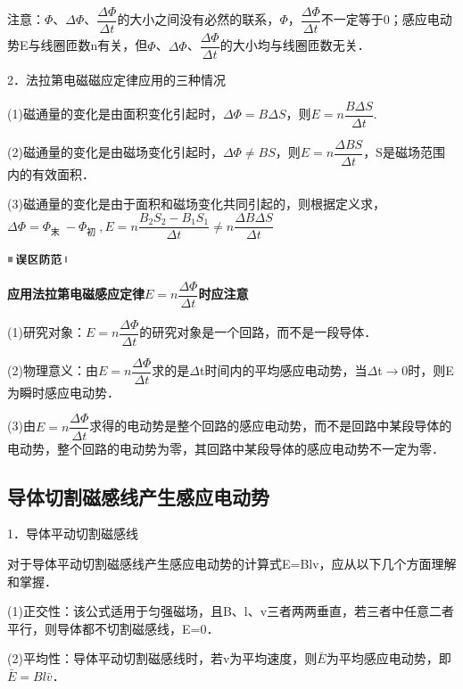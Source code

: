 注意：$\Phi$、$\Delta \Phi$、$\dfrac{\Delta\Phi}{\Delta t}$的大小之间没有必然的联系，$\Phi$，$\dfrac{\Delta\Phi}{\Delta t}$不一定等于0；感应电动势E与线圈匝数n有关，但$\Phi$、$\Delta \Phi$、$\dfrac{\Delta\Phi}{\Delta t}$的大小均与线圈匝数无关．

2．法拉第电磁磁应定律应用的三种情况

(1)磁通量的变化是由面积变化引起时，$\Delta \Phi=B\Delta S$，则$E=n \dfrac{B \Delta S}{\Delta t}$.　

(2)磁通量的变化是由磁场变化引起时，$\Delta \Phi \neq BS$，则$E=n \dfrac{ \Delta BS}{\Delta t}$，S是磁场范围内的有效面积．

(3)磁通量的变化是由于面积和磁场变化共同引起的，则根据定义求，$\Delta \Phi=\Phi_{\text {末 }}-\Phi_{\text {初 }}, E=n \dfrac{B_{2} S_{2}-B_{1} S_{1}}{\Delta t} \neq n \dfrac{\Delta B \Delta S}{\Delta t}$

\begin{center}\includegraphics[width=0.70764in,height=0.12292in]{media/image34.png}\end{center}
\begin{center}
	\textbf{应用法拉第电磁感应定律$E=n \dfrac{\Delta \Phi}{\Delta t}$时应注意}
\end{center}


(1)研究对象：$E=n \dfrac{\Delta \Phi}{\Delta t}$的研究对象是一个回路，而不是一段导体．

(2)物理意义：由$E=n \dfrac{\Delta \Phi}{\Delta t}$求的是$\Delta$t时间内的平均感应电动势，当$\Delta$t$\rightarrow$0时，则E为瞬时感应电动势．

(3)由$E=n \dfrac{\Delta \Phi}{\Delta t}$求得的电动势是整个回路的感应电动势，而不是回路中某段导体的电动势，整个回路的电动势为零，其回路中某段导体的感应电动势不一定为零．

\newpage
\subsection{导体切割磁感线产生感应电动势}

1．导体平动切割磁感线

对于导体平动切割磁感线产生感应电动势的计算式E=Blv，应从以下几个方面理解和掌握．

(1)正交性：该公式适用于匀强磁场，且B、l、v三者两两垂直，若三者中任意二者平行，则导体都不切割磁感线，E=0．

(2)平均性：导体平动切割磁感线时，若v为平均速度，则$\bar E$为平均感应电动势，即$\bar E =Bl\bar v$．


